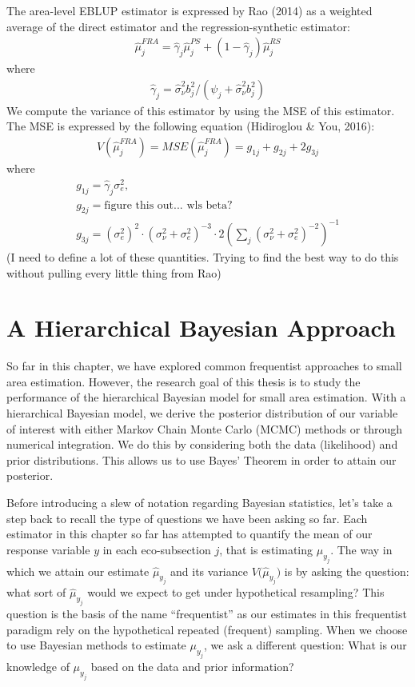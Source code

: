 \documentclass[12pt,twoside]{reedthesis}
\begin{document}
The area-level EBLUP estimator is expressed by Rao (2014) as a weighted average of the direct estimator and the regression-synthetic estimator:
\begin{align}
\hat \mu_j^{FRA} = \hat\gamma_j \hat\mu_j^{PS} + (1 - \hat\gamma_j) \hat\mu_j^{RS} \label{eq:eblup-area-weight}
\end{align}
where
\begin{align}
\hat \gamma_j = \hat \sigma_\nu^2 b_j^2 / (\psi_j + \hat\sigma_\nu^2 b_j^2)
\end{align}
We compute the variance of this estimator by using the MSE of this estimator. The MSE is expressed by the following equation (Hidiroglou \& You, 2016):
\begin{align}
V(\hat\mu_j^{FRA}) = MSE(\hat\mu_j^{FRA}) = g_{1j} + g_{2j} + 2g_{3j}
\end{align}
where
\begin{align*}
g_{1j} = \hat\gamma_j \sigma^2_e, \\
g_{2j} = \text{figure this out... wls beta?} \\
g_{3j} = (\sigma^2_e)^2 \cdot (\sigma^2_\nu + \sigma^2_e)^{-3} \cdot 2(\sum_{j} (\sigma^2_\nu + \sigma^2_e)^{-2})^{-1}
\end{align*}
(I need to define a lot of these quantities. Trying to find the best way to do this without pulling every little thing from Rao)

\hypertarget{a-hierarchical-bayesian-approach}{%
\section{A Hierarchical Bayesian Approach}\label{a-hierarchical-bayesian-approach}}

So far in this chapter, we have explored common frequentist approaches to small area estimation. However, the research goal of this thesis is to study the performance of the hierarchical Bayesian model for small area estimation. With a hierarchical Bayesian model, we derive the posterior distribution of our variable of interest with either Markov Chain Monte Carlo (MCMC) methods or through numerical integration. We do this by considering both the data (likelihood) and prior distributions. This allows us to use Bayes' Theorem in order to attain our posterior.

Before introducing a slew of notation regarding Bayesian statistics, let's take a step back to recall the type of questions we have been asking so far. Each estimator in this chapter so far has attempted to quantify the mean of our response variable \(y\) in each eco-subsection \(j\), that is estimating \(\mu_{y_j}\). The way in which we attain our estimate \(\hat\mu_{y_j}\) and its variance \(V\Big(\hat\mu_{y_j}\Big)\) is by asking the question: what sort of \(\hat\mu_{y_j}\) would we expect to get under hypothetical resampling? This question is the basis of the name ``frequentist'' as our estimates in this frequentist paradigm rely on the hypothetical repeated (frequent) sampling. When we choose to use Bayesian methods to estimate \(\mu_{y_j}\), we ask a different question: What is our knowledge of \(\mu_{y_j}\) based on the data and prior information?
\end{document}
